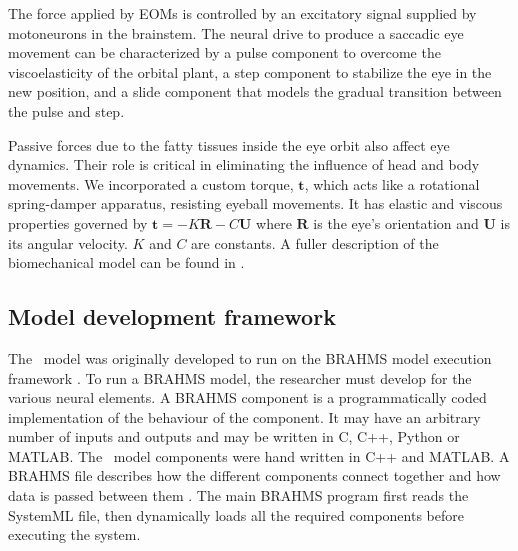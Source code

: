 \documentclass{frontiersSCNS}
\begin{document}
The force applied by EOMs is controlled by an excitatory signal
supplied by motoneurons in the brainstem. The neural drive to produce
a saccadic eye movement can be characterized by a pulse component to
overcome the viscoelasticity of the orbital plant, a step component to
stabilize the eye in the new position, and a slide component that
models the gradual transition between the pulse and step.

Passive forces due to the fatty tissues inside the eye orbit also
affect eye dynamics. Their role is critical in eliminating the
influence of head and body movements. We incorporated a custom torque,
$\mathbf{t}$, which acts like a rotational spring-damper apparatus,
resisting eyeball movements. It has elastic and viscous properties
governed by $\mathbf{t} = -K\mathbf{R}-C\mathbf{U}$ where $\mathbf{R}$
is the eye's orientation and $\mathbf{U}$ is its angular velocity. $K$
and $C$ are constants. A fuller description of the biomechanical model
can be found in \cite{papapavlou_physics-based_2014}.


\subsection{Model development framework} \label{sec:methods:framework}

The \ccg~model was originally developed to run on the BRAHMS model
execution framework
\citep{mitchinson_brahms:_2010,mitchinson_brahms_2015}. To run a
BRAHMS model, the researcher must develop  for
the various neural elements. A BRAHMS component is a programmatically
coded implementation of the behaviour of the component. It may have an
arbitrary number of inputs and outputs and may be written in C, C++,
Python or MATLAB. The \ccg~model components were hand written in C++
and MATLAB. A BRAHMS  file describes how the different
components connect together and how data is passed between them
\citep{mitchinson_brahms:_2010}. The main BRAHMS program first
reads the SystemML file, then dynamically loads all the required
components before executing the system.
\end{document}
